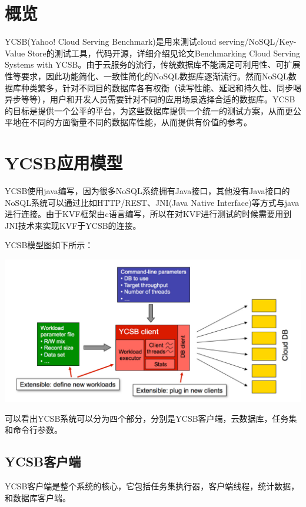 \section{概览}\label{sec:Overview}
	YCSB(Yahoo! Cloud Serving Benchmark)是用来测试cloud serving/NoSQL/Key-Value Store的测试工具，代码开源，详细介绍见论文Benchmarking Cloud Serving Systems with YCSB。由于云服务的流行，传统数据库不能满足可利用性、可扩展性等要求，因此功能简化、一致性简化的NoSQL数据库逐渐流行。然而NoSQL数据库种类繁多，针对不同目的数据库各有权衡（读写性能、延迟和持久性、同步喝异步等等），用户和开发人员需要针对不同的应用场景选择合适的数据库。YCSB的目标是提供一个公平的平台，为这些数据库提供一个统一的测试方案，从而更公平地在不同的方面衡量不同的数据库性能，从而提供有价值的参考。

\section{YCSB应用模型}\label{sec:YCSB-Model}

	YCSB使用java编写，因为很多NoSQL系统拥有Java接口，其他没有Java接口的NoSQL系统可以通过比如HTTP/REST、JNI(Java Native Interface)等方式与java进行连接。由于KVF框架由c语言编写，所以在对KVF进行测试的时候需要用到JNI技术来实现KVF于YCSB的连接。

	YCSB模型图如下所示：

\begin{center}
	\includegraphics[width=13.9cm]{img/figure10.pdf}
\end{center}

	可以看出YCSB系统可以分为四个部分，分别是YCSB客户端，云数据库，任务集和命令行参数。

	\subsection{YCSB客户端}
		YCSB客户端是整个系统的核心，它包括任务集执行器，客户端线程，统计数据，和数据库客户端。

